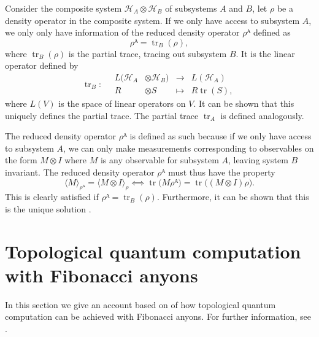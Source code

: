 \documentclass[a4paper,10pt,oneside]{book}
\theoremstyle{plain}
\theoremstyle{definition}
\theoremstyle{remark}
\begin{document}
Consider the composite system $\mathcal{H}_A ⊗ \mathcal{H}_B$ of subsystems $A$ and $B$, let $ρ$ be a density operator in the composite system. If we only have access to subsystem $A$, we only only have information of the reduced density operator $ρᴬ$ defined as
\begin{equation}
  ρᴬ = \operatorname{tr}_B(ρ),
\end{equation}
where $\operatorname{tr}_B(ρ)$ is the partial trace, tracing out subsystem $B$. It is the linear operator defined by
\begin{equation}
  \operatorname{tr}_B : \quad
  \begin{alignedat}{2}
    L(\mathcal{H}_A &⊗ \mathcal{H}_B) &{}\to{}& L(\mathcal{H}_A) \\
    R&⊗S &{}↦{}& R\operatorname{tr}(S),
  \end{alignedat}
\end{equation}
where $L(V)$ is the space of linear operators on $V$. It can be shown that this uniquely defines the partial trace. The partial trace $\operatorname{tr}_A$ is defined analogously.

The reduced density operator $ρᴬ$ is defined as such because if we only have access to subsystem $A$, we can only make measurements corresponding to observables on the form $M⊗I$ where $M$ is any observable for subsystem $A$, leaving system $B$ invariant. The reduced density operator $ρᴬ$ must thus have the property
\begin{equation}
  ⟨M⟩_{ρᴬ} = ⟨M⊗I⟩_ρ ⟺
  \operatorname{tr}\big(Mρᴬ\big)
  = \operatorname{tr}\big((M⊗I)ρ\big).
\end{equation}
This is clearly satisfied if $ρᴬ = \operatorname{tr}_B(ρ)$. Furthermore, it can be shown that this is the unique solution \cite{nielsen chuang}.













\section{Topological quantum computation with Fibonacci anyons}\label{sec:computing with fibonacci}

In this section we give an account based on  of how topological quantum computation can be achieved with Fibonacci anyons. For further information, see \cite{topological quantum compiling,kitaev fault-tolerant anyons,kauffman lomonaco,wang book,pachos book,asymptotical top compl,slingerland bais}.
\end{document}

